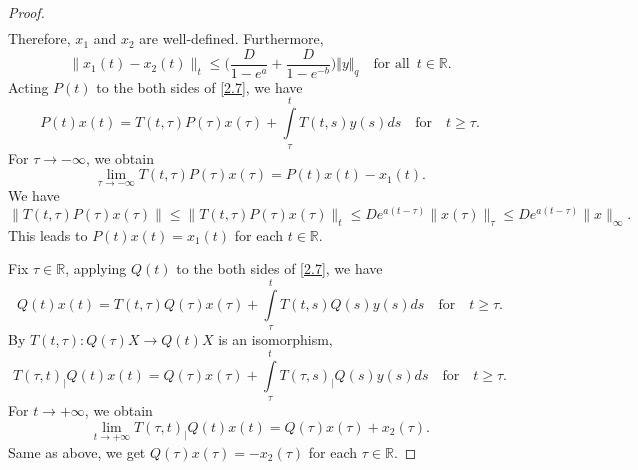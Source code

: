 \documentclass[reqno]{amsart}
\def\r{\mathbb{R}}
\begin{document}
\begin{proof}
\begin{align*}
\end{align*}
Therefore, $x_1$ and $x_2$ are well-defined. Furthermore,
\begin{equation}\label{eq1}
 \|x_1(t)-x_2(t)\|_t \le \Big(\frac{D}{1-e^{a}} + \frac{D}{1-e^{-{b}}}\Big) \Vert y\Vert _q \quad \text{for all }\, t\in \r.
\end{equation}
Acting $P(t)$ to the both sides of \eqref{2.7}, we have
$$ P(t)x(t)= T(t,\tau)P(\tau)x(\tau)+\displaystyle\int\limits_{\tau}^{t}T(t,s)y(s)ds  \quad  \text{for} \quad t\geq \tau.$$
For $\tau \to -\infty$, we obtain
$$ \lim_{\tau \to -\infty}T(t,\tau)P(\tau)x(\tau) =  P(t)x(t) - x_1(t).$$
We have
$$\|T(t,\tau)P(\tau)x(\tau)\| \le \|T(t,\tau)P(\tau)x(\tau)\|_{t} \le D e^{a(t-\tau)} \|x(\tau)\|_{\tau} \le D e^{a(t-\tau)} \|x\|_{\infty}.$$
This leads to $P(t)x(t) = x_1(t)$ for each $t \in \mathbb{R}$.

Fix $\tau \in \mathbb{R} $, applying $Q(t)$ to the both sides of \eqref{2.7}, we have
$$ Q(t)x(t)= T(t,\tau)Q(\tau)x(\tau)+\displaystyle\int\limits_{\tau}^{t}T(t,s)Q(s)y(s)ds  \quad  \text{for} \quad t\geq \tau.$$
By $T(t,\tau): Q(\tau)X \to Q(t)X$ is an isomorphism, 
$$ T(\tau,t)_| Q(t)x(t) = Q(\tau)x(\tau)+\displaystyle\int\limits_{\tau}^{t}T(\tau,s)_|Q(s)y(s)ds \quad  \text{for} \quad t\geq \tau.$$
For $t \to +\infty$, we obtain
$$ \lim_{t\to +\infty}T(\tau,t)_| Q(t)x(t) = Q(\tau)x(\tau)+ x_2(\tau).$$
Same as above, we get $Q(\tau)x(\tau)= -x_2(\tau)$ for each $\tau \in \mathbb{R}$.


\end{proof}
\end{document}
